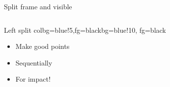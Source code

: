 \begin{frame}{Split frame and visible}
\begin{columns}[T]
\begin{column}{0.48\textwidth}
	\begin{myblock}{Left split col}{bg=blue!5,fg=black}{bg=blue!10, fg=black}
		\begin{itemize}
			\item<1-> Make good points
			\item<2-> Sequentially
			\item<3-> For impact!
		\end{itemize}
	\end{myblock}
\end{column}
\end{columns}
\end{frame}